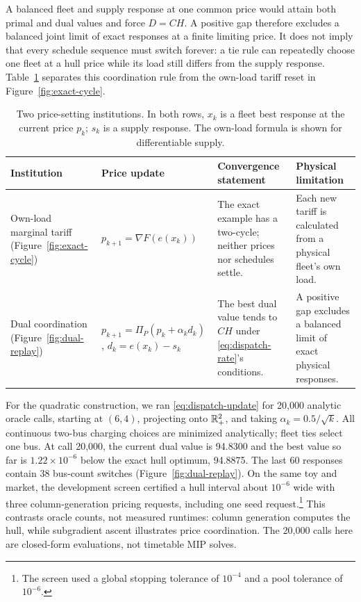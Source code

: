 A balanced fleet and supply response at one common price would attain
both primal and dual values and force $D=CH$. A positive gap therefore
excludes a balanced joint limit of exact responses at a finite limiting
price. It does not imply that every schedule sequence must switch forever:
a tie rule can repeatedly choose one fleet at a hull price while its load
still differs from the supply response. Table~\ref{tab:institutions}
separates this coordination rule from the own-load tariff reset in
Figure~\ref{fig:exact-cycle}.

\begin{table}[t]
\centering\small
\caption{Two price-setting institutions. In both rows, $x_k$ is a fleet
best response at the current price $p_k$; $s_k$ is a supply response.
The own-load formula is shown for differentiable supply.}
\label{tab:institutions}
\begin{tabularx}{\linewidth}{@{}>{\raggedright\arraybackslash}p{.17\linewidth}
>{\raggedright\arraybackslash}p{.29\linewidth}
>{\raggedright\arraybackslash}X>{\raggedright\arraybackslash}X@{}}
\toprule
Institution & Price update & Convergence statement & Physical limitation\\
\midrule
Own-load marginal tariff (Figure~\ref{fig:exact-cycle}) &
$p_{k+1}=\nabla F(e(x_k))$ &
The exact example has a two-cycle; neither prices nor schedules settle. &
Each new tariff is calculated from a physical fleet's own load.\\
Dual coordination (Figure~\ref{fig:dual-replay}) &
$p_{k+1}=\Pi_P(p_k+\alpha_kd_k)$,\newline
$d_k=e(x_k)-s_k$ &
The best dual value tends to $CH$ under \eqref{eq:dispatch-rate}'s conditions. &
A positive gap excludes a balanced limit of exact physical responses.\\
\bottomrule
\end{tabularx}
\end{table}

For the quadratic construction, we ran \eqref{eq:dispatch-update} for
20,000 analytic oracle calls, starting at $(6,4)$, projecting onto
$\mathbb R_+^2$, and taking $\alpha_k=0.5/\sqrt k$. All continuous two-bus
charging choices are minimized analytically; fleet ties select one bus.
At call 20,000, the current dual value is 94.8300 and the best value so far
is $1.22\times10^{-6}$ below the exact hull optimum, 94.8875. The last
60 responses contain 38 bus-count switches (Figure~\ref{fig:dual-replay}).
On the same toy and market, the development screen certified a hull interval
about $10^{-6}$ wide with three column-generation pricing requests, including
one seed request.\footnote{The screen used a global stopping tolerance of
$10^{-4}$ and a pool tolerance of $10^{-6}$.}
This contrasts oracle counts, not measured runtimes:
column generation computes the hull, while subgradient ascent illustrates
price coordination. The 20,000 calls here are closed-form evaluations, not
timetable MIP solves.

